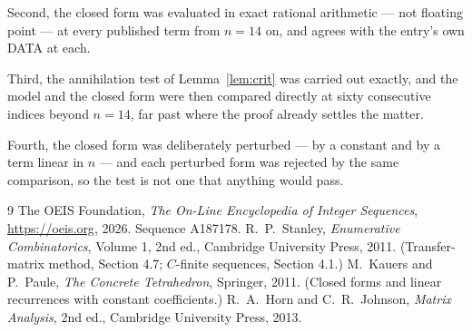 \documentclass[11pt,a4paper]{article}
\theoremstyle{plain}
\theoremstyle{definition}
\begin{document}
Second, the closed form was evaluated in exact rational arithmetic --- not floating point ---
at every published term from $n=14$ on, and agrees with the entry's own DATA at each.

Third, the annihilation test of Lemma~\ref{lem:crit} was carried out exactly, and the model
and the closed form were then compared directly at sixty consecutive indices beyond
$n=14$, far past where the proof already settles the matter.

Fourth, the closed form was deliberately perturbed --- by a constant and by a term linear in
$n$ --- and each perturbed form was rejected by the same comparison, so the test is not one
that anything would pass.

\begin{thebibliography}{9}
 The OEIS Foundation, \emph{The On-Line Encyclopedia of Integer
Sequences}, \url{https://oeis.org}, 2026. Sequence A187178.
 R.~P.~Stanley, \emph{Enumerative Combinatorics}, Volume 1, 2nd ed.,
Cambridge University Press, 2011. (Transfer-matrix method, Section 4.7; $C$-finite sequences,
Section 4.1.)
 M.~Kauers and P.~Paule, \emph{The Concrete Tetrahedron}, Springer, 2011.
(Closed forms and linear recurrences with constant coefficients.)
 R.~A.~Horn and C.~R.~Johnson, \emph{Matrix Analysis}, 2nd ed., Cambridge
University Press, 2013.
\end{thebibliography}
\end{document}
